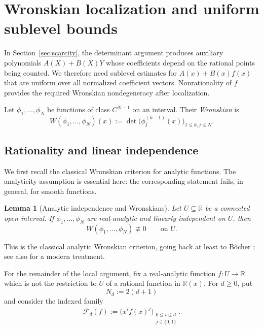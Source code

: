 \documentclass[11pt]{amsart}
\numberwithin{equation}{section}
\newtheorem{lemma}[lemma]{Lemma}
\theoremstyle{definition}
\theoremstyle{remark}
\newcommand{\R}{\mathbb R}
\begin{document}
\section{Wronskian localization and uniform sublevel bounds}
\label{sec:wronskians}

In Section~\ref{sec:scarcity}, the determinant argument produces auxiliary
polynomials $A(X)+B(X)Y$ whose coefficients depend on the
rational points being counted. We therefore need sublevel
estimates for $A(x)+B(x)f(x)$ that are uniform over all normalized
coefficient vectors. Nonrationality of $f$ provides the required
Wronskian nondegeneracy after localization.

Let $\phi_1,\ldots,\phi_N$ be functions of class $C^{N-1}$ on an
interval. Their \textit{Wronskian} is
\begin{equation}\label{eq:wronskian-definition-en}
W(\phi_1,\ldots,\phi_N)(x)
:=
\det\bigl(\phi_j^{(k-1)}(x)\bigr)_{1\leq k,j\leq N}.
\end{equation}

\subsection{Rationality and linear independence}

We first recall the classical Wronskian criterion for analytic
functions. The analyticity assumption is essential here: the
corresponding statement fails, in general, for smooth functions.

\begin{lemma}[Analytic independence and Wronskians]
\label{lem:analytic-wronskian-en}
Let $U\subseteq\R$ be a connected open interval. If
$\phi_1,\ldots,\phi_N$ are real-analytic and linearly independent on
$U$, then
\[
W(\phi_1,\ldots,\phi_N)\not\equiv0
\qquad\text{on }U.
\]
\end{lemma}

This is the classical analytic Wronskian criterion, going back at least
to B\^ocher \cite{Bocher1900}; see also \cite{BostanDumas2010} for a modern
treatment.

For the remainder of the local argument, fix a real-analytic function
$f:U\to\R$ which is not the restriction to $U$ of a rational function
in $\R(x)$. For $d\geq0$, put
\begin{equation}\label{eq:N-d-en}
N_d:=2(d+1)
\end{equation}
and consider the indexed family
\begin{equation}\label{eq:rational-family-en}
\mathcal F_d(f)
:=
\bigl(x^i f(x)^j\bigr)_{\substack{0\leq i\leq d\\ j\in\{0,1\}}}.
\end{equation}
\end{document}
